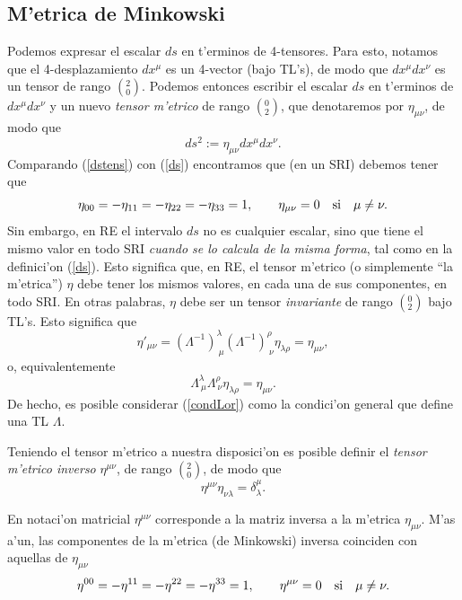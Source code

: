 \subsection{M'etrica de Minkowski}
Podemos expresar el escalar $ds$ en t'erminos de 4-tensores. Para esto, notamos
que el 4-desplazamiento $dx^\mu$ es un 4-vector (bajo TL's), de modo que
$dx^\mu dx^\nu$ es un tensor de rango $(^2_0)$. Podemos entonces escribir
el escalar $ds$ en t'erminos de $dx^\mu dx^\nu$ y un nuevo \textit{tensor
m'etrico} de rango $(^0_2)$, que denotaremos por $\eta_{\mu\nu}$, de modo que
\begin{equation}
ds^2:=\eta_{\mu\nu}dx^\mu dx^\nu. \label{dstens}
\end{equation}
Comparando (\ref{dstens}) con (\ref{ds}) encontramos que (en un SRI)
debemos tener que
\begin{equation}
\eta_{00}=-\eta_{11}=-\eta_{22}=-\eta_{33}=1, \qquad \eta_{\mu\nu}=0
\quad\rm{si}\quad \mu\neq\nu .
\end{equation}
Sin embargo, en RE el intervalo $ds$ no es cualquier escalar, sino que tiene el mismo valor en todo SRI \textit{cuando se lo calcula de la misma forma}, tal como en la definici'on (\ref{ds}). Esto significa que, en RE, el tensor m'etrico (o simplemente ``la m'etrica'') $\eta$ debe tener los mismos valores, en cada una de sus componentes, en todo SRI. En  otras palabras, $\eta$ debe ser un tensor \textit{invariante} de rango $(^0_2)$ bajo TL's. Esto significa que
\begin{equation}
\eta'_{\mu\nu}=\left( \Lambda^{-1}\right)^{\lambda}_{\ \mu}\left(
\Lambda^{-1}\right)^{\rho}_{\ \nu}\eta_{\lambda\rho}=\eta_{\mu\nu},
\end{equation}
o, equivalentemente
\begin{equation}
\boxed{\Lambda^\lambda_{\ \mu}\Lambda^\rho_{\ \nu}\eta_{\lambda\rho}=\eta_{\mu\nu}.}
\label{condLor}
\end{equation}
De hecho, es posible considerar (\ref{condLor}) como la condici'on general que define una TL $\Lambda$.

Teniendo el tensor m'etrico a nuestra disposici'on es posible definir el \textit{tensor m'etrico inverso} $\eta^{\mu\nu}$, de rango $(^2_0)$, de modo que
\begin{equation}
\boxed{\eta^{\mu\nu}\eta_{\nu\lambda}=\delta^\mu_\lambda .}\label{definv}
\end{equation}

En notaci'on matricial $\eta^{\mu\nu}$ corresponde a la matriz inversa a la
m'etrica $\eta_{\mu\nu}$. M'as a'un, las componentes de la m'etrica (de
Minkowski) inversa coinciden con aquellas de $\eta_{\mu\nu}$
\begin{equation}
\eta^{00}=-\eta^{11}=-\eta^{22}=-\eta^{33}=1, \qquad \eta^{\mu\nu}=0
\quad\rm{si}\quad \mu\neq\nu .
\end{equation}

